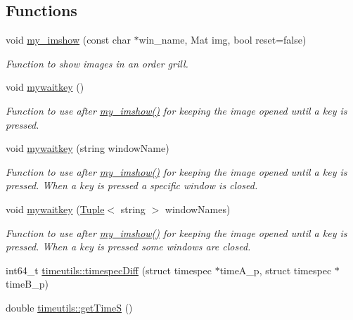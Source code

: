 \subsection*{Functions}
\begin{DoxyCompactItemize}
\item 
void \mbox{\hyperlink{utils_8hh_aabfea83501dfccfa4c420b8c19ceefd7}{my\+\_\+imshow}} (const char $\ast$win\+\_\+name, Mat img, bool reset=false)
\begin{DoxyCompactList}\small\item\em Function to show images in an order grill. \end{DoxyCompactList}\item 
void \mbox{\hyperlink{utils_8hh_abcbca5e81e43b340e78e92d29108d4e5}{mywaitkey}} ()
\begin{DoxyCompactList}\small\item\em Function to use after \mbox{\hyperlink{utils_8hh_aabfea83501dfccfa4c420b8c19ceefd7}{my\+\_\+imshow()}} for keeping the image opened until a key is pressed. \end{DoxyCompactList}\item 
void \mbox{\hyperlink{utils_8hh_a31ae190fba03c3a422a13a4271e0e424}{mywaitkey}} (string window\+Name)
\begin{DoxyCompactList}\small\item\em Function to use after \mbox{\hyperlink{utils_8hh_aabfea83501dfccfa4c420b8c19ceefd7}{my\+\_\+imshow()}} for keeping the image opened until a key is pressed. When a key is pressed a specific window is closed. \end{DoxyCompactList}\item 
void \mbox{\hyperlink{utils_8hh_a0807d925012933fcd1df713f65e35d6b}{mywaitkey}} (\mbox{\hyperlink{class_tuple}{Tuple}}$<$ string $>$ window\+Names)
\begin{DoxyCompactList}\small\item\em Function to use after \mbox{\hyperlink{utils_8hh_aabfea83501dfccfa4c420b8c19ceefd7}{my\+\_\+imshow()}} for keeping the image opened until a key is pressed. When a key is pressed some windows are closed. \end{DoxyCompactList}\item 
int64\+\_\+t \mbox{\hyperlink{namespacetimeutils_a3d9d509a7028cffae8aef9c70f6c2c52}{timeutils\+::timespec\+Diff}} (struct timespec $\ast$time\+A\+\_\+p, struct timespec $\ast$time\+B\+\_\+p)
\item 
double \mbox{\hyperlink{namespacetimeutils_aa732b7f41462ff727daef77bd5030b9c}{timeutils\+::get\+TimeS}} ()
\end{DoxyCompactItemize}


